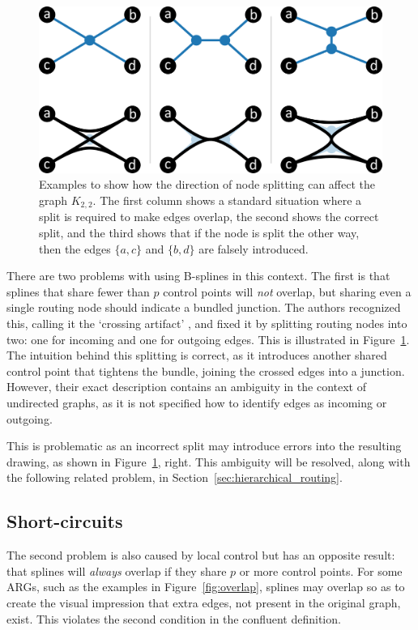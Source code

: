\begin{figure}
  \centering
  \includegraphics[width=.8\textwidth]{power/nodesplit.pdf}
  \caption[Examples of the node split problem]{Examples to show how the direction of node splitting can affect the graph $K_{2,2}$. The first column shows a standard situation where a split is required to make edges overlap, the second shows the correct split, and the third shows that if the node is split the other way, then the edges $\{a,c\}$ and $\{b,d\}$ are falsely introduced.
  }
  \label{fig:nodesplit}
\end{figure}

There are two problems with using B-splines in this context. The first is that splines that share fewer than $p$ control points will \emph{not} overlap, but sharing even a single routing node should indicate a bundled junction.
The authors recognized this, calling it the `crossing artifact' \citep[Fig.~4]{Bach2017}, and fixed it by splitting routing nodes into two: one for incoming and one for outgoing edges. This is illustrated in Figure~\ref{fig:nodesplit}.
The intuition behind this splitting is correct, as it introduces another shared control point that tightens the bundle, joining the crossed edges into a junction. However, their exact description contains an ambiguity in the context of undirected graphs, as it is not specified how to identify edges as incoming or outgoing.

This is problematic as an incorrect split may introduce errors into the resulting drawing, as shown in Figure~\ref{fig:nodesplit}, right.
This ambiguity will be resolved, along with the following related problem, in Section~\ref{sec:hierarchical_routing}.

\subsection{Short-circuits}
\label{sec:short_circuits}
The second problem is also caused by local control but has an opposite result: that splines will \emph{always} overlap if they share $p$ or more control points.
For some ARGs, such as the examples in Figure~\ref{fig:overlap}, splines may overlap so as to create the visual impression that extra edges, not present in the original graph, exist. This violates the second condition in the confluent definition.

